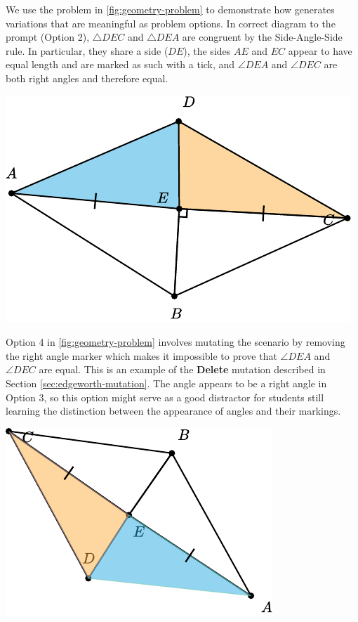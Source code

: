 
We use the problem in \cref{fig:geometry-problem} to demonstrate how \Edgeworth generates variations that are meaningful as problem options. In correct diagram to the prompt (Option 2), $\triangle DEC$ and $\triangle DEA$ are congruent by the Side-Angle-Side rule. In particular, they share a side ($DE$), the sides $AE$ and $EC$ appear to have equal length and are marked as such with a tick, and $\angle DEA$ and $\angle DEC$ are both right angles and therefore equal. 

\begin{center}
   \includegraphics[width=.3\linewidth]{assets/edgeworth/congruent-triangles-opt-2.pdf}
\end{center}


Option 4 in \cref{fig:geometry-problem} involves mutating the scenario by removing the right angle marker which makes it impossible to prove that $\angle DEA$ and $\angle DEC$ are equal. This is an example of the \textbf{Delete} mutation described in Section \ref{sec:edgeworth-mutation}. The angle appears to be a right angle in Option 3, so this option might serve as a good distractor for students still learning the distinction between the appearance of angles and their markings.

\begin{center}
   \includegraphics[width=.3\linewidth]{assets/edgeworth/congruent-triangles-opt-4.pdf}
\end{center}


